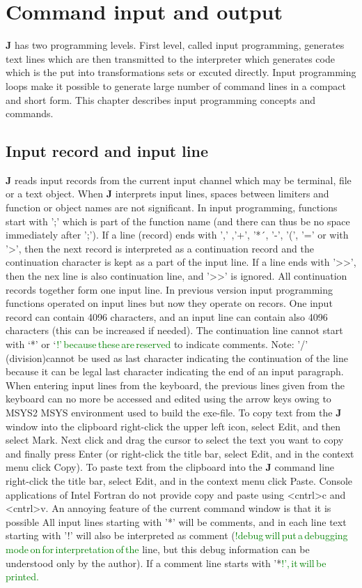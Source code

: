 \section{Command input and output}
\label{cominout}
\textbf{J} has two programming levels. First level, called input programming, generates text lines which are then
transmitted to the interpreter which generates code which is the put into transformations sets or
excuted directly. Input programming loops make it possible to generate large number of command lines
in a compact and short form. This chapter describes input programming concepts and commands.
\subsection{Input record and input line}
\label{inpuline}
\textbf{J} reads input records from the current input channel which may be terminal, file or a text object.
When \textbf{J} interprets input lines, spaces between limiters and function or object names are not
significant. In input programming, functions start with ';' which is part of the function name (and
there can thus be no space immediately after ';'). If a line (record) ends with ',' ,'+', '*´, '-',
'(', '=' or with '>', then the next record is interpreted as a continuation record and
the continuation character is kept as a part of the input
line. If a line ends with '>>', then
the nex line is also continuation line, and  '>>' is ignored. All continuation
records together form one input line. In previous version input programming functions operated on input lines
but now they operate on recors. One input record can contain 4096 characters, and an input line can contain also 4096 characters
(this can be increased if needed).
The continuation line cannot start with ‘*’ or ‘\textcolor{green}{!’\,because\,these\,are\,reserved}
to indicate comments.  Note: '/' (division)cannot be used as last character indicating the continuation of the line because it can
be legal last character indicating the end of an input paragraph.
When entering input lines from the keyboard, the previous lines given from the keyboard can no more be
accessed and edited using the arrow keys owing to MSYS2 MSYS environment used to build the exe-file.
To copy text from the \textbf{J} window into the clipboard right-click the upper left icon, select Edit,
and then select Mark. Next click and drag the cursor to select the text you want to copy and
finally press Enter (or right-click the title bar, select Edit, and in the context menu click Copy).
To paste text from the clipboard into the \textbf{J} command line right-click the title bar, select Edit,
and in the context menu click Paste. Console applications of Intel Fortran do not provide copy
and paste using <cntrl>c and <cntrl>v. An annoying feature of the current command window is that it is possible
All input lines starting with '*' will be comments, and in each line text starting with '!' will also
be interpreted as comment (\textcolor{green}{!debug\,will\,put\,a\,debugging\,mode\,on\,for\,interpretation\,of\,the}
line, but this debug information can be understood only by the author). If a comment line starts
with '*\textcolor{green}{!',\,it\,will\,be\,printed.}
